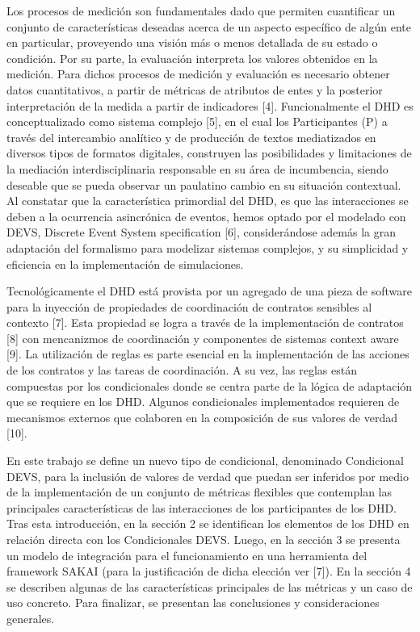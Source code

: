 Los procesos de medición son fundamentales dado que permiten cuantificar un
conjunto de características deseadas acerca de un aspecto específico de algún
ente en particular, proveyendo una visión más o menos detallada de su estado o
condición. Por su parte, la evaluación interpreta los valores obtenidos en la
medición. Para dichos procesos de medición y evaluación es necesario obtener
datos cuantitativos, a partir de métricas de atributos de entes y la posterior
interpretación de la medida a partir de indicadores [4].
Funcionalmente el DHD es conceptualizado como sistema complejo [5], en el cual
los Participantes (P) a través del intercambio analítico y de producción de
textos mediatizados en diversos tipos de formatos digitales, construyen las
posibilidades y limitaciones de la mediación interdisciplinaria responsable en
su área de incumbencia, siendo deseable que se pueda observar un paulatino
cambio en su situación contextual. Al constatar que la característica primordial
del DHD, es que las interacciones se deben a la ocurrencia asincrónica de
eventos, hemos optado por el modelado con DEVS, Discrete Event System
specification [6], considerándose además la gran adaptación del formalismo para
modelizar sistemas complejos, y su simplicidad y eficiencia en la implementación
de simulaciones.


Tecnológicamente el DHD está provista por un agregado de una pieza de software
para la inyección de propiedades de coordinación de contratos sensibles al
contexto [7]. Esta propiedad se logra a través de la implementación de contratos
[8] con mencanizmos de coordinación y componentes de sistemas context aware [9].
La utilización de reglas es parte esencial en la implementación de las acciones
de los contratos y las tareas de coordinación. A su vez, las reglas están
compuestas por los condicionales donde se centra parte de la lógica de
adaptación que se requiere en los DHD. Algunos condicionales implementados
requieren de mecanismos externos que colaboren en la composición de sus valores
de verdad [10].

En este trabajo se define un nuevo tipo de condicional, denominado Condicional
DEVS, para la inclusión de valores de verdad que puedan ser inferidos por medio
de la implementación de un conjunto de métricas flexibles que contemplan las
principales características de las interacciones de los participantes de los
DHD. Tras esta introducción, en la sección 2 se identifican los elementos de los
DHD en relación directa con los Condicionales DEVS. Luego, en la sección 3 se
presenta un modelo de integración para el funcionamiento en una herramienta del
framework SAKAI (para la justificación de dicha elección ver [7]). En la sección
4 se describen algunas de las características principales de las métricas y un
caso de uso concreto. Para finalizar, se presentan las conclusiones y
consideraciones generales.

